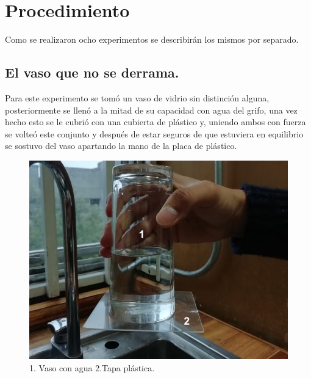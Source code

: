 \documentclass[10pt,a4paper]{article}
\begin{document}
\newpage
\section{Procedimiento}
Como se realizaron ocho experimentos se describirán los mismos por separado.

\subsection*{El vaso que no se derrama.}
Para este experimento se tomó un vaso de vidrio sin distinción alguna, posteriormente se llenó a la mitad de su capacidad con agua del grifo, una vez hecho esto se le cubrió con una cubierta de plástico y, uniendo ambos con fuerza se volteó este conjunto y después de estar seguros de que estuviera en equilibrio se sostuvo del vaso apartando la mano de la placa de plástico.
\begin{figure}[H]
\includegraphics[scale=0.22]{vaso1.png}
\centering
\caption{1. Vaso con agua 2.Tapa plástica.}
\end{figure}
\end{document}
